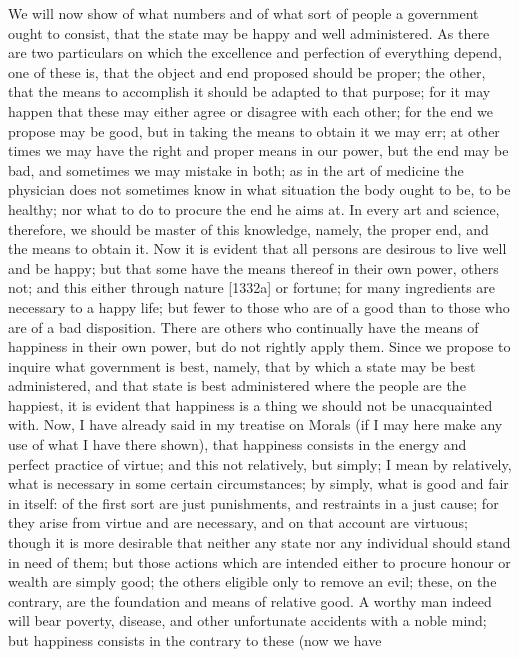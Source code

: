 
We will now show of what numbers and of what sort of people a government
ought to consist, that the state may be happy and well administered. As
there are two particulars on which the excellence and perfection of
everything depend, one of these is, that the object and end proposed
should be proper; the other, that the means to accomplish it should be
adapted to that purpose; for it may happen that these may either agree or
disagree with each other; for the end we propose may be good, but in
taking the means to obtain it we may err; at other times we may have the
right and proper means in our power, but the end may be bad, and sometimes
we may mistake in both; as in the art of medicine the physician does not
sometimes know in what situation the body ought to be, to be healthy; nor
what to do to procure the end he aims at. In every art and science,
therefore, we should be master of this knowledge, namely, the proper end,
and the means to obtain it. Now it is evident that all persons are
desirous to live well and be happy; but that some have the means thereof
in their own power, others not; and this either through nature [1332a] or
fortune; for many ingredients are necessary to a happy life; but fewer to
those who are of a good than to those who are of a bad disposition. There
are others who continually have the means of happiness in their own power,
but do not rightly apply them. Since we propose to inquire what government
is best, namely, that by which a state may be best administered, and that
state is best administered where the people are the happiest, it is
evident that happiness is a thing we should not be unacquainted with. Now,
I have already said in my treatise on Morals (if I may here make any use
of what I have there shown), that happiness consists in the energy and
perfect practice of virtue; and this not relatively, but simply; I mean by
relatively, what is necessary in some certain circumstances; by simply,
what is good and fair in itself: of the first sort are just punishments,
and restraints in a just cause; for they arise from virtue and are
necessary, and on that account are virtuous; though it is more desirable
that neither any state nor any individual should stand in need of them;
but those actions which are intended either to procure honour or wealth
are simply good; the others eligible only to remove an evil; these, on the
contrary, are the foundation and means of relative good. A worthy man
indeed will bear poverty, disease, and other unfortunate accidents with a
noble mind; but happiness consists in the contrary to these (now we have
